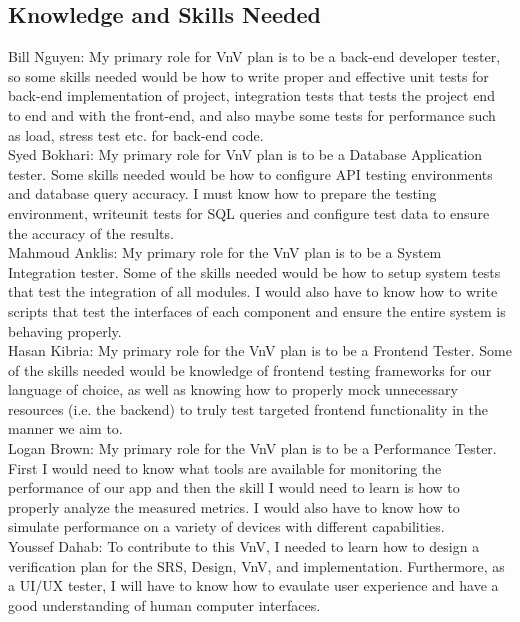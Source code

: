 \documentclass[12pt, titlepage]{article}
\begin{document}
\subsection{Knowledge and Skills Needed}

\noindent Bill Nguyen: My primary role for VnV plan is to be a back-end developer tester, so some skills needed would be how to write proper and effective unit tests for back-end implementation of project, integration tests that tests the project end to end and with the front-end, and also maybe some tests for performance such as load, stress test etc. for back-end code.\\

\noindent Syed Bokhari: My primary role for VnV plan is to be a Database Application tester. Some skills needed would be how to configure API testing environments and database query accuracy. I must know how to prepare the testing environment, writeunit tests for SQL queries and configure test data to ensure the accuracy of the results.\\

\noindent Mahmoud Anklis: My primary role for the VnV plan is to be a System Integration tester. Some of the skills needed would be how to setup system tests that test the integration of all modules. I would also have to know how to write scripts that test the interfaces of each component and ensure the entire system is behaving properly.\\

\noindent Hasan Kibria: My primary role for the VnV plan is to be a Frontend Tester. Some of the skills needed would be knowledge of frontend testing frameworks for our language of choice, as well as knowing how to properly mock unnecessary resources (i.e. the backend) to truly test targeted frontend functionality in the manner we aim to.\\

\noindent Logan Brown: My primary role for the VnV plan is to be a Performance Tester. First I would need to know what tools are available for monitoring the performance of our app and then the skill I would need to learn is how to properly analyze the measured metrics. I would also have to know how to simulate performance on a variety of devices with different capabilities.\\

\noindent Youssef Dahab: To contribute to this VnV, I needed to learn how to design a verification plan for the SRS, Design, VnV, and implementation. Furthermore, as a UI/UX tester, I will have to know how to evaulate user experience and have a good understanding of human computer interfaces.\\
\end{document}

